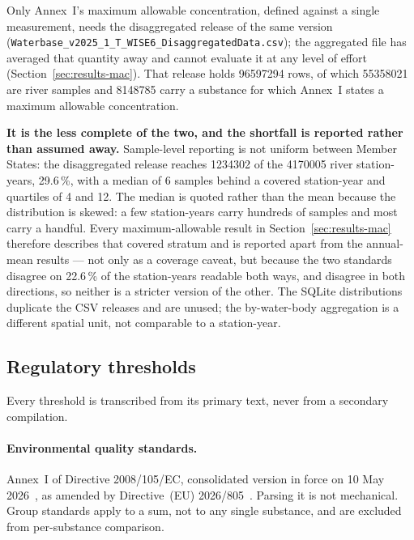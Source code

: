 Only Annex~I's maximum allowable concentration, defined against a single
measurement, needs the disaggregated release of the same version
(\texttt{Waterbase\_v2025\_1\_T\_WISE6\_DisaggregatedData.csv}); the
aggregated file has averaged that quantity away and cannot evaluate it at any
level of effort (Section~\ref{sec:results-mac}). That release holds
\num{96597294} rows, of which \num{55358021} are river samples and
\num{8148785} carry a substance for which Annex~I states a maximum allowable
concentration.

\textbf{It is the less complete of the two, and the shortfall is reported
rather than assumed away.} Sample-level reporting is not uniform between Member
States: the disaggregated release reaches \num{1234302} of the
\num{4170005} river station-years, \num{29.6}\,\%, with a median of
\num{6} samples behind a covered station-year and quartiles of \num{4}
and \num{12}. The median is
quoted rather than the mean because the distribution is skewed: a few
station-years carry hundreds of samples and most carry a handful. Every
maximum-allowable result in Section~\ref{sec:results-mac} therefore describes
that covered stratum and is reported apart from the annual-mean results --- not
only as a coverage caveat, but because the two standards disagree on
\num{22.6}\,\% of the station-years readable both ways, and disagree in both
directions, so neither is a stricter version of the other. The SQLite distributions
duplicate the CSV releases and are unused; the by-water-body aggregation is a
different spatial unit, not comparable to a station-year.

\subsection{Regulatory thresholds}
Every threshold is transcribed from its primary text, never from a secondary
compilation.

\paragraph{Environmental quality standards.}
Annex~I of Directive 2008/105/EC, consolidated version in force on 10 May
2026~\cite{eu2008eqs,eu2013priority}, as amended by Directive~(EU)
2026/805~\cite{eu2026amend}. Parsing it is not
mechanical. Group standards apply to a sum,
not to any single substance, and are excluded from per-substance comparison.

